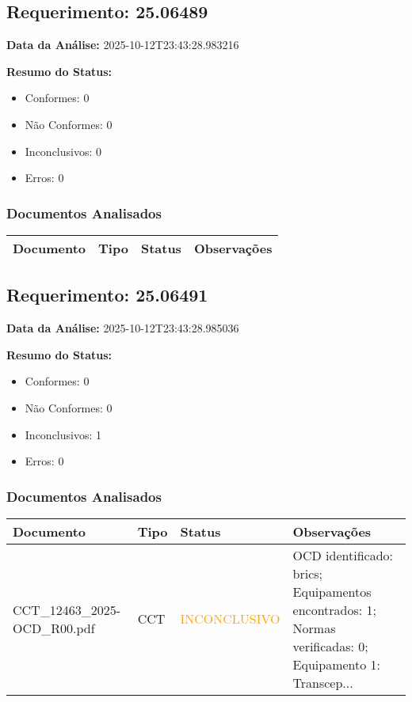 \documentclass[12pt,a4paper]{article}
\begin{document}
\subsection{Requerimento: 25.06489}

\textbf{Data da Análise:} 2025-10-12T23:43:28.983216

\textbf{Resumo do Status:}
\begin{itemize}
    \item Conformes: 0
    \item Não Conformes: 0
    \item Inconclusivos: 0
    \item Erros: 0
\end{itemize}

\subsubsection{Documentos Analisados}

\begin{longtable}{|p{4cm}|p{2cm}|p{2cm}|p{6cm}|}
\hline
\textbf{Documento} & \textbf{Tipo} & \textbf{Status} & \textbf{Observações} \\
\hline
\endhead
\end{longtable}


\subsection{Requerimento: 25.06491}

\textbf{Data da Análise:} 2025-10-12T23:43:28.985036

\textbf{Resumo do Status:}
\begin{itemize}
    \item Conformes: 0
    \item Não Conformes: 0
    \item Inconclusivos: 1
    \item Erros: 0
\end{itemize}

\subsubsection{Documentos Analisados}

\begin{longtable}{|p{4cm}|p{2cm}|p{2cm}|p{6cm}|}
\hline
\textbf{Documento} & \textbf{Tipo} & \textbf{Status} & \textbf{Observações} \\
\hline
\endhead
CCT\_12463\_2025-OCD\_R00.pdf & CCT & \textcolor{orange}{INCONCLUSIVO} & OCD identificado: brics; Equipamentos encontrados: 1; Normas verificadas: 0; Equipamento 1: Transcep... \\
\hline
\end{longtable}
\end{document}
